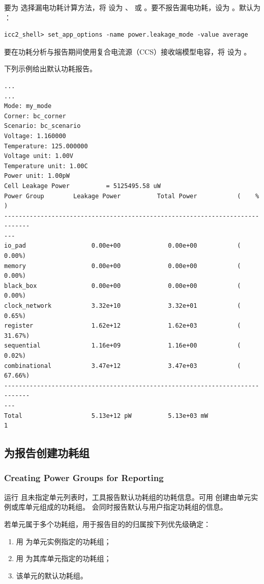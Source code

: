 要为  选择漏电功耗计算方法，将  设为 、 或 。要不报告漏电功耗，设为 。默认为 ：
\begin{lstlisting}
icc2_shell> set_app_options -name power.leakage_mode -value average
\end{lstlisting}

要在功耗分析与报告期间使用复合电流源（CCS）接收端模型电容，将  设为 。

下列示例给出默认功耗报告。

\begin{lstlisting}[caption={默认功耗报告}]
...
...
Mode: my_mode
Corner: bc_corner
Scenario: bc_scenario
Voltage: 1.160000
Temperature: 125.000000
Voltage unit: 1.00V
Temperature unit: 1.00C
Power unit: 1.00pW
Cell Leakage Power          = 5125495.58 uW
Power Group        Leakage Power          Total Power           (    % )
-----------------------------------------------------------------------------
---
io_pad                  0.00e+00             0.00e+00           ( 0.00%)
memory                  0.00e+00             0.00e+00           ( 0.00%)
black_box               0.00e+00             0.00e+00           ( 0.00%)
clock_network           3.32e+10             3.32e+01           ( 0.65%)
register                1.62e+12             1.62e+03           ( 31.67%)
sequential              1.16e+09             1.16e+00           ( 0.02%)
combinational           3.47e+12             3.47e+03           ( 67.66%)
-----------------------------------------------------------------------------
---
Total                   5.13e+12 pW          5.13e+03 mW
1
\end{lstlisting}

\subsection{为报告创建功耗组}
\subsubsection*{Creating Power Groups for Reporting}

运行  且未指定单元列表时，工具报告默认功耗组的功耗信息。可用  创建由单元实例或库单元组成的功耗组。 会同时报告默认与用户指定功耗组的信息。

若单元属于多个功耗组，用于报告目的的归属按下列优先级确定：
\begin{enumerate}
  \item 用  为单元实例指定的功耗组；
  \item 用  为其库单元指定的功耗组；
  \item 该单元的默认功耗组。
\end{enumerate}

